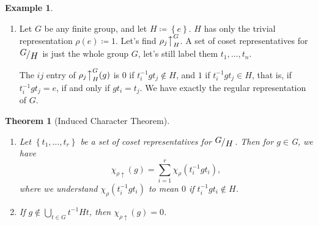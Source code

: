 \documentclass[12pt]{article}
\newcommand{\cx}{\mathbb{C}}
\newcommand{\real}{\mathbb{R}}
\newcommand\inv[1]{#1^{-1}}
\newcommand\setb[1]{\left \{ #1 \right \}}
\newcommand{\quotient}[2]{{\makebox[\width-2.3pt][l]{\raisebox{.2em}{$#1$}}\left/\raisebox{-.2em}{$#2$}\right.}}
\newtheorem{theorem}{Theorem}[section]
\theoremstyle{definition}
\newtheorem{example}{Example}[section]
\begin{document}
\begin{example}
\begin{enumerate}
\begin{equation}
\begin{split}
                & = 2 \cos \left( \frac{2 \pi j}{n} \right),\\
                \chi_{\rho_j \uparrow}(s) & = 0.
            \end{split}
        \end{equation}
        This agrees with the character of the 2-dimensional $\rho$-tation representation that we found before by letting $D_n$ act on $\real^2$ (or $\cx^2$) by rotating the plane through an angle of $\theta_j \coloneqq  \frac{2 \pi j}{n}$:
        \begin{equation}
            \rho_j : r \mapsto 
            \begin{bmatrix}
                \cos \theta_j & -\sin \theta_j \\
                \sin \theta_j & \cos \theta_j
            \end{bmatrix}, \qquad \rho_j : s \mapsto
            \begin{bmatrix}
                -1 & 0 \\
                0 & 1
            \end{bmatrix}.
        \end{equation}
        Since the characters agree, they must be the same representation, just in a different basis.
        \item Let $G$ be any finite group, and let $H \coloneqq  \setb{e}$. $H$ has only the trivial representation $\rho(e) \coloneqq  1$. Let's find $\rho_j \big\uparrow_H^G$. A set of coset representatives for $\quotient{G}{H}$ is just the whole group $G$, let's still label them $t_1 , \dotsc, t_n$. 
        
        The $ij$ entry of $\rho_j \big\uparrow_H^G(g)$ is $0$ if $\inv{t_i} g t_j \notin H$, and $1$ if $\inv{t_i} g t_j \in H$, that is, if $\inv{t_i} g t_j = e$, if and only if $g t_i = t_j$. We have exactly the regular representation of $G$.
    \end{enumerate}
\end{example}
\begin{theorem}[Induced Character Theorem]
    \noindent
    \begin{enumerate}
        \item Let $\setb{t_1 , \dotsc , t_r}$ be a set of coset representatives for $\quotient{G}{H}$. Then for $g \in $G, we have
        \begin{equation}
            \chi_{\rho \uparrow}(g) = \sum\limits_{i = 1}^r \chi_{\rho} \left( \inv{t_i} g t_i \right),
        \end{equation}
        where we understand $\chi_{\rho} \left( \inv{t_i} g t_i \right)$ to mean $0$ if $\inv{t_i} g t_i \notin H$.
        \item If $g \notin \bigcup\limits_{t \in G} \inv{t} H t$, then $\chi_{\rho \uparrow}(g) = 0$.
    \end{enumerate}
\end{theorem}
\end{document}
